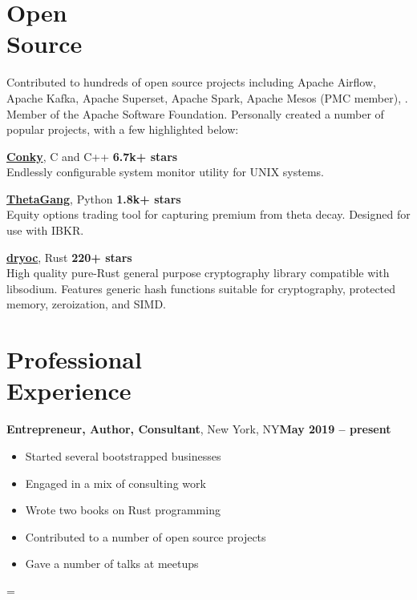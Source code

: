 \documentclass[margin,line]{resume}
\newenvironment{absolutelynopagebreak}
  {\par\nobreak\vfil\penalty0\vfilneg
   \vtop\bgroup}
  {\par\xdef\tpd{\the\prevdepth}\egroup
   \prevdepth=\tpd}
\begin{document}
\begin{resume}
    \section{\mysidestyle Open\\Source}

    Contributed to hundreds of open source projects including Apache Airflow,
    Apache Kafka, Apache Superset, Apache Spark, Apache Mesos (PMC member), . Member of the
    Apache Software Foundation. Personally created a number of popular projects,
    with a few highlighted below:

    \href{https://github.com/brndnmtthws/conky}{\textbf{Conky}}, C and C++ \hfill \textbf{6.7k+ stars}\\
    Endlessly configurable system monitor utility for UNIX systems.

    \href{https://github.com/brndnmtthws/thetagang}{\textbf{ThetaGang}}, Python \hfill \textbf{1.8k+ stars}\\
    Equity options trading tool for capturing premium from theta decay. Designed
    for use with IBKR.

    \href{https://github.com/brndnmtthws/dryoc}{\textbf{dryoc}}, Rust \hfill \textbf{220+ stars}\\
    High quality pure-Rust general purpose cryptography library compatible with
    libsodium.  Features generic hash functions suitable for cryptography,
    protected memory, zeroization, and SIMD.

    \vspace{3mm}

    \begin{absolutelynopagebreak}
    \section{\mysidestyle Professional\\Experience}

    \textbf{Entrepreneur, Author, Consultant}, New York, NY\hfill \textbf{May 2019 -- present}\vspace{2mm}\\\vspace{1mm}%
    \begin{itemize}
        \item Started several bootstrapped businesses
        \item Engaged in a mix of consulting work
        \item Wrote two books on Rust programming
        \item Contributed to a number of open source projects
        \item Gave a number of talks at meetups
    \end{itemize}
    \end{absolutelynopagebreak}


\end{resume}
\end{document}

